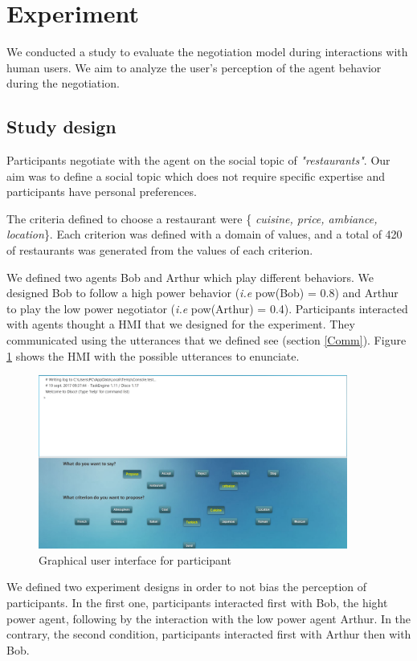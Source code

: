 \documentclass[runningheads,a4paper]{llncs}
\begin{document}
\section{Experiment}
	We conducted a study to evaluate the negotiation model during interactions with human users. We aim to analyze the user's perception of the agent behavior during the negotiation.
	
	\subsection{Study design}
		
		Participants negotiate with the agent on the social topic of \emph{"restaurants"}. Our aim was to define a social topic which does not require specific expertise and participants have personal preferences.
		
		The criteria defined to choose a restaurant were \{ \textit{cuisine, price, ambiance, location}\}. Each criterion was defined with a domain of values, and a total of 420 of restaurants was generated from the values of each criterion.
		
		We defined two agents Bob and Arthur which play different behaviors. We designed Bob to follow a high power behavior (\textit{i.e} pow(Bob) = 0.8) and Arthur to play the low power negotiator (\textit{i.e} pow(Arthur) = 0.4).
		Participants interacted with agents thought a HMI that we designed for the experiment. They communicated using the utterances that we defined see (section \ref{Comm}). Figure \ref{ihm} shows the HMI with the possible utterances to enunciate.
		
		\begin{figure}
			\centering
			\includegraphics[width=4in]{graphs/ihm.png}
			\caption{Graphical user interface for participant}
			\label{ihm}
		\end{figure}
		
		We defined two experiment designs in order to not bias the perception of participants. In the first one, participants interacted first with Bob, the hight power agent, following by the interaction with the low power agent Arthur. In the contrary, the second condition, participants interacted first with Arthur then with Bob. 
		 
\end{document}
